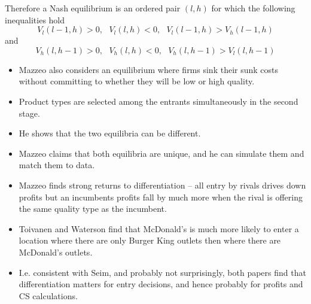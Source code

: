 \documentclass[notes=show]{beamer}
\begin{document}
\begin{frame}%


Therefore a Nash equilibrium is an ordered pair $(l,h)$ for which the
following inequalities hold 
\begin{equation*}
V_{l}(l-1,h)>0,\text{ }V_{l}(l,h)<0,\text{ }V_{l}(l-1,h)>V_{h}(l-1,h)
\end{equation*}%
and 
\begin{equation*}
V_{h}(l,h-1)>0,\text{ }V_{h}(l,h)<0,\text{ }V_{h}(l,h-1)>V_{l}(l,h-1)
\end{equation*}

\begin{itemize}
\item Mazzeo also considers an equilibrium where firms sink their sunk costs
without committing to whether they will be low or high quality.

\item Product types are selected among the entrants simultaneously in the
second stage.

\item He shows that the two equilibria can be different.

\item Mazzeo claims that both equilibria are unique, and he can simulate
them and match them to data.
\end{itemize}

\end{frame}%

\begin{frame}%


\begin{itemize}
\item Mazzeo finds strong returns to differentiation -- all entry by rivals
drives down profits but an incumbents profits fall by much more when the
rival is offering the same quality type as the incumbent.

\item Toivanen and Waterson find that McDonald's is much more likely to
enter a location where there are only Burger King outlets then where there
are McDonald's outlets.

\item I.e. consistent with Seim, and probably not surprisingly, both papers
find that differentiation matters for entry decisions, and hence probably
for profits and CS calculations.
\end{itemize}

\end{frame}%
\end{document}
